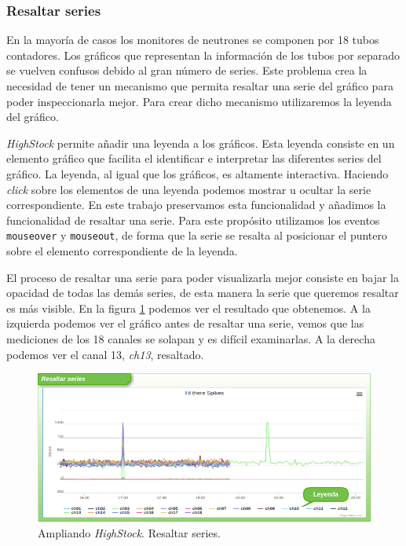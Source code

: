 		\subsubsection{Resaltar series}
			En la mayoría de casos los monitores de neutrones se componen por 18 tubos contadores. Los gráficos que representan la
			información de los tubos por separado se vuelven confusos debido al gran número de series. Este problema crea la necesidad de
			tener un mecanismo que permita resaltar una serie del gráfico para poder inspeccionarla mejor. Para crear dicho mecanismo
			utilizaremos la leyenda del gráfico.
			\par
			\emph{HighStock} permite añadir una leyenda a los gráficos. Esta leyenda consiste en un elemento gráfico que facilita el identificar
			e interpretar las diferentes series del gráfico. La leyenda, al igual que los gráficos, es altamente interactiva. Haciendo
			\emph{click} sobre los elementos de una leyenda podemos mostrar u ocultar la serie correspondiente. En este trabajo
			preservamos esta funcionalidad y añadimos la funcionalidad de resaltar una serie. Para este propósito utilizamos los eventos
			\texttt{mouseover} y \texttt{mouseout}, de forma que la serie se resalta al posicionar el puntero sobre el elemento
			correspondiente de la leyenda. 
			\par
			El proceso de resaltar una serie para poder visualizarla mejor consiste en bajar la opacidad de todas las demás series, de
			esta manera la serie que queremos resaltar es más visible. En la figura \ref{fig:resalto} podemos ver el resultado que
			obtenemos. A la izquierda podemos ver el gráfico antes de resaltar una serie, vemos que las mediciones de los 18 canales se
			solapan y es difícil examinarlas. A la derecha podemos ver el canal 13, \emph{ch13}, resaltado.
			\begin{figure}[h]
				\centering
				\includegraphics[keepaspectratio, width=1\textwidth]{./img/resalto.png}
				\caption{Ampliando \emph{HighStock}. Resaltar series.}   
				\label{fig:resalto}
			\end{figure}
	
